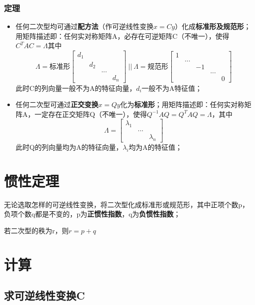 \subsubsection{定理}
\begin{itemize}
    \item 任何二次型均可通过\textbf{配方法}（作可逆线性变换\(x = Cy\)）化成\textbf{标准形及规范形}；用矩阵描述即：任何实对称矩阵A，必存在可逆矩阵C（不唯一），使得\(C^TAC = \Lambda\)其中\[\Lambda = \text{标准形}\begin{bmatrix}
        d_1 \\ 
        & d_2 \\ 
        & & ... \\ 
        & & & d_n
    \end{bmatrix}\ ||\ \Lambda = \text{规范形}\begin{bmatrix}
        1 \\ 
        & ... \\ 
        & & -1 \\ 
        & & & ... \\ 
        & & & & 0
    \end{bmatrix}\]
    此时C的列向量一般不为A的特征向量，\(d_i\)一般不为A特征值；
    
    \item 任何二次型可通过\textbf{正交变换}\(x = Qy\)化为\textbf{标准形}；用矩阵描述即：任何实对称矩阵A，一定存在正交矩阵Q（不唯一），使得\(Q^{-1}AQ = Q^TAQ = \Lambda\)，其中\[\Lambda = \begin{bmatrix}
        \lambda_1 \\ 
        & ... \\ 
        & & \lambda_n
    \end{bmatrix}\]
    此时Q的列向量均为A的特征向量，\(\lambda_i\)均为A的特征值；
\end{itemize}


\section{惯性定理}
无论选取怎样的可逆线性变换，将二次型化成标准形或规范形，其中正项个数p，负项个数q都是不变的，p为\textbf{正惯性指数}，q为\textbf{负惯性指数}；

若二次型的秩为r，则\(r = p + q\)


\section{计算}

\subsection{求可逆线性变换C}

